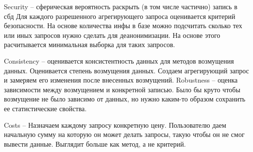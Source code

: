 Security -- сферическая вероятность раскрыть (в том числе частично) запись в сбд
Для каждого разрешенного агрегирующего запроса оценивается критерий безопасности. На основе количества инфы в базе можно подсчитать сколько тех или иных запросов нужно сделать для деанонимизации. На основе этого расчитывается минимальная выборка для таких запросов.

Consistency -- оценивается консистентность данных для методов возмущения данных. Оценивается степень возмущения данных. Создаем агрегирующий запрос и замеряем его изменения после внесенных возмущений.
Robustness -- оценка зависимости между возмущением и конкретной записью. Было бы круто чтобы возмущение не было зависимо от данных, но нужно каким-то образом сохранить ее статистические свойства.

Costs -- Назначаем каждому запросу конкретную цену. Пользователю даем начальную сумму на которую он может делать запросы, такую чтобы он не смог вывести данные. Выглядит больше как метод, а не критерий.
